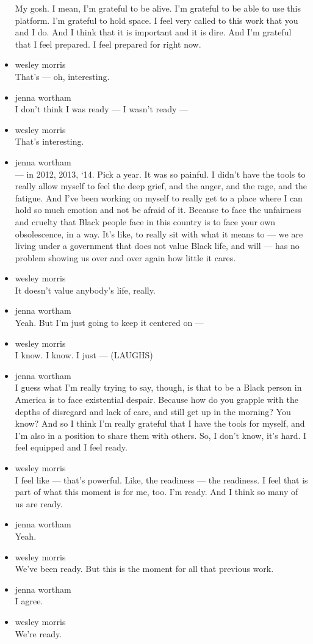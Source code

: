 \begin{itemize}
  My gosh. I mean, I'm grateful to be alive. I'm grateful to be able to
  use this platform. I'm grateful to hold space. I feel very called to
  this work that you and I do. And I think that it is important and it
  is dire. And I'm grateful that I feel prepared. I feel prepared for
  right now.
\item
  wesley morris\\
  That's --- oh, interesting.
\item
  jenna wortham\\
  I don't think I was ready --- I wasn't ready ---
\item
  wesley morris\\
  That's interesting.
\item
  jenna wortham\\
  --- in 2012, 2013, `14. Pick a year. It was so painful. I didn't have
  the tools to really allow myself to feel the deep grief, and the
  anger, and the rage, and the fatigue. And I've been working on myself
  to really get to a place where I can hold so much emotion and not be
  afraid of it. Because to face the unfairness and cruelty that Black
  people face in this country is to face your own obsolescence, in a
  way. It's like, to really sit with what it means to --- we are living
  under a government that does not value Black life, and will --- has no
  problem showing us over and over again how little it cares.
\item
  wesley morris\\
  It doesn't value anybody's life, really.
\item
  jenna wortham\\
  Yeah. But I'm just going to keep it centered on ---
\item
  wesley morris\\
  I know. I know. I just --- (LAUGHS)
\item
  jenna wortham\\
  I guess what I'm really trying to say, though, is that to be a Black
  person in America is to face existential despair. Because how do you
  grapple with the depths of disregard and lack of care, and still get
  up in the morning? You know? And so I think I'm really grateful that I
  have the tools for myself, and I'm also in a position to share them
  with others. So, I don't know, it's hard. I feel equipped and I feel
  ready.
\item
  wesley morris\\
  I feel like --- that's powerful. Like, the readiness --- the
  readiness. I feel that is part of what this moment is for me, too. I'm
  ready. And I think so many of us are ready.
\item
  jenna wortham\\
  Yeah.
\item
  wesley morris\\
  We've been ready. But this is the moment for all that previous work.
\item
  jenna wortham\\
  I agree.
\item
  wesley morris\\
  We're ready.
\end{itemize}

